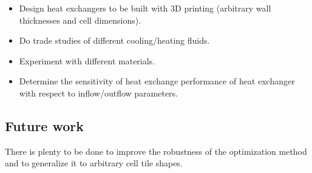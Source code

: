 \documentclass{article}
\begin{document}
\begin{itemize}
	\item Design heat exchangers to be built with 3D printing (arbitrary wall thicknesses and cell dimensions).
	\item Do trade studies of different cooling/heating fluids.
    \item Experiment with different materials. 
    \item Determine the sensitivity of heat exchange performance of heat exchanger with respect to inflow/outflow parameters. 
\end{itemize}

\subsection{Future work}

There is plenty to be done to improve the robustness of the optimization method and to generalize it to arbitrary cell tile shapes. 
\end{document}
